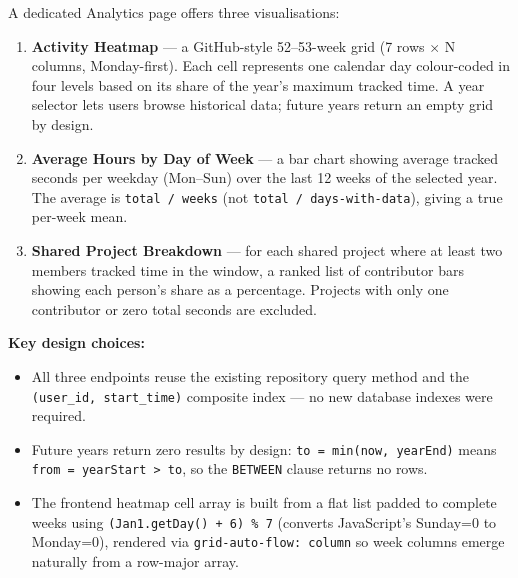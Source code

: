 \documentclass[a4paper, 12pt]{article}
\begin{document}
A dedicated Analytics page offers three visualisations:

\begin{enumerate}
  \item \textbf{Activity Heatmap} --- a GitHub-style 52--53-week grid (7 rows $\times$
        N columns, Monday-first). Each cell represents one calendar day colour-coded in four
        levels based on its share of the year's maximum tracked time. A year selector lets
        users browse historical data; future years return an empty grid by design.
  \item \textbf{Average Hours by Day of Week} --- a bar chart showing average tracked seconds
        per weekday (Mon--Sun) over the last 12 weeks of the selected year. The average is
        \texttt{total / weeks} (not \texttt{total / days-with-data}), giving a true
        per-week mean.
  \item \textbf{Shared Project Breakdown} --- for each shared project where at least two
        members tracked time in the window, a ranked list of contributor bars showing each
        person's share as a percentage. Projects with only one contributor or zero total
        seconds are excluded.
\end{enumerate}

\textbf{Key design choices:}
\begin{itemize}
  \item All three endpoints reuse the existing repository query method and the
        \texttt{(user\_id, start\_time)} composite index --- no new database indexes were required.
  \item Future years return zero results by design: \texttt{to = min(now, yearEnd)} means
        \texttt{from = yearStart > to}, so the \texttt{BETWEEN} clause returns no rows.
  \item The frontend heatmap cell array is built from a flat list padded to complete weeks
        using \texttt{(Jan1.getDay() + 6) \% 7} (converts JavaScript's Sunday=0 to
        Monday=0), rendered via \texttt{grid-auto-flow: column} so week columns emerge
        naturally from a row-major array.
\end{itemize}



\end{document}
